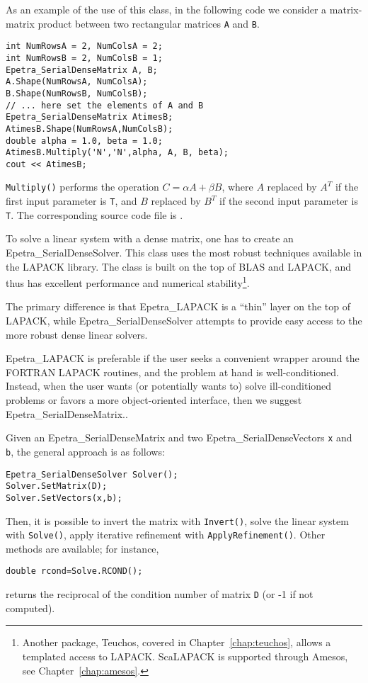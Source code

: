 As an example of the use of this class, in the following code we
consider a matrix-matrix product between two rectangular matrices
\verb!A! and \verb!B!. 
\begin{verbatim}
int NumRowsA = 2, NumColsA = 2;
int NumRowsB = 2, NumColsB = 1;
Epetra_SerialDenseMatrix A, B;
A.Shape(NumRowsA, NumColsA);
B.Shape(NumRowsB, NumColsB);
// ... here set the elements of A and B
Epetra_SerialDenseMatrix AtimesB;
AtimesB.Shape(NumRowsA,NumColsB);  
double alpha = 1.0, beta = 1.0;
AtimesB.Multiply('N','N',alpha, A, B, beta);
cout << AtimesB;
\end{verbatim}
\verb!Multiply()! performs the operation $C = \alpha A + \beta B$, where
$A$ replaced by $A^T$ if the first input parameter is \verb!T!, and $B$
replaced by $B^T$ if the second input parameter is \verb!T!.  The
corresponding source code file is .

\smallskip

To solve a linear system with a dense matrix, one has to create an
Epetra\_SerialDenseSolver. This class uses the most robust techniques
available in the LAPACK library. The class is built on the top of BLAS
and LAPACK, and thus has excellent performance and numerical
stability\footnote{Another package, Teuchos, covered in
  Chapter~\ref{chap:teuchos}, allows a templated access to LAPACK.
  ScaLAPACK is supported through Amesos, see
  Chapter~\ref{chap:amesos}.}.

The primary difference is that Epetra\_LAPACK is a ``thin'' layer on the
top of LAPACK, while Epetra\_SerialDenseSolver attempts to provide easy
access to the more robust dense linear solvers.

Epetra\_LAPACK is preferable if the user seeks a convenient wrapper
around the FORTRAN LAPACK routines, and the problem at hand is
well-conditioned. Instead, when the user wants (or potentially wants to)
solve ill-conditioned problems or favors a more object-oriented
interface, then we suggest Epetra\_SerialDenseMatrix..

\smallskip

Given an Epetra\_SerialDenseMatrix and two Epetra\_SerialDenseVectors
{\tt x} and {\tt b}, the general approach is as follows:
\begin{verbatim}
Epetra_SerialDenseSolver Solver();
Solver.SetMatrix(D);
Solver.SetVectors(x,b);
\end{verbatim}
Then, it is possible to invert the matrix with \verb!Invert()!, solve
the linear system with \verb!Solve()!, apply iterative refinement with
\verb!ApplyRefinement()!. Other methods are available; for instance,
\begin{verbatim}
double rcond=Solve.RCOND();
\end{verbatim}
returns the reciprocal of the condition number of matrix {\tt D} (or -1
if not computed).

